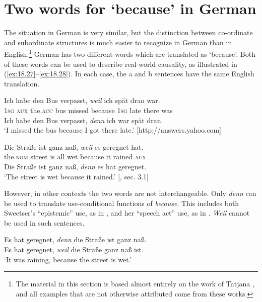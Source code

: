 \section{Two words for ‘because’ in German}\label{sec:18.5}


The situation in German is very similar, but the distinction between co-ordinate and subordinate structures is much easier to recognize in German than in English.\footnote{The material in this section is based almost entirely on the work of Tatjana \citet{Scheffler2005,Scheffler2008}, and all examples that are not otherwise attributed come from these works.} German has two different words which are translated as ‘because’. Both of these words can be used to describe real-world causality, as illustrated in (\ref{ex:18.27}--\ref{ex:18.28}). In each case, the a and b sentences have the same English translation.


\ea \label{ex:18.27}
\ea  \gll Ich  habe  den  Bus  verpasst,  \textit{weil}  ich  spät  dran  war.\\
\textsc{1sg}  \textsc{aux}  the.\textsc{acc}  bus  missed  because  \textsc{1sg}  late  there  was\\
\ex  Ich habe den Bus verpasst, \textit{denn} ich war spät dran.\\
\glt ‘I missed the bus because I got there late.’ [http://answers.yahoo.com]
\z \z

\ea \label{ex:18.28}
\ea  \gll  Die  Straße  ist  ganz  naß,  \textit{weil}  es  geregnet  hat.\\
the.\textsc{nom}  street  is  all  wet  because  it  rained  \textsc{aux}\\
\ex \gll Die Straße ist ganz naß, \textit{denn} es hat geregnet.\\
‘The street is wet because it rained.’  [\citealt{Scheffler2008}, sec. 3.1]\\
\z \z

However, in other contexts the two words are not interchangeable. Only \textit{denn} can be used to translate use-conditional functions of \textit{because}. This includes both Sweetser’s “epistemic” use, as in , and her “speech act” use, as in . \textit{Weil} cannot be used in such sentences.


\ea \label{ex:18.29}
\ea  Es hat geregnet, \textit{denn} die Straße ist ganz naß.\\
\ex *Es hat geregnet, \textit{weil} die Straße ganz naß ist.\\
‘It was raining, because the street is wet.’
                       \z
\z

